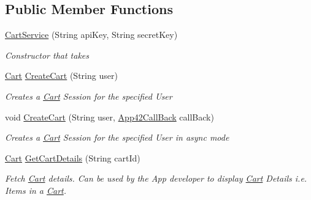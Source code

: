 \subsection*{Public Member Functions}
\begin{DoxyCompactItemize}
\item 
\hyperlink{classcom_1_1shephertz_1_1app42_1_1paas_1_1sdk_1_1csharp_1_1shopping_1_1_cart_service_ae756b1c4cf96224f610c576245f5f782}{Cart\+Service} (String api\+Key, String secret\+Key)
\begin{DoxyCompactList}\small\item\em Constructor that takes \end{DoxyCompactList}\item 
\hyperlink{classcom_1_1shephertz_1_1app42_1_1paas_1_1sdk_1_1csharp_1_1shopping_1_1_cart}{Cart} \hyperlink{classcom_1_1shephertz_1_1app42_1_1paas_1_1sdk_1_1csharp_1_1shopping_1_1_cart_service_a8267edf4fa76e8c868a1ca04895db941}{Create\+Cart} (String user)
\begin{DoxyCompactList}\small\item\em Creates a \hyperlink{classcom_1_1shephertz_1_1app42_1_1paas_1_1sdk_1_1csharp_1_1shopping_1_1_cart}{Cart} Session for the specified User \end{DoxyCompactList}\item 
void \hyperlink{classcom_1_1shephertz_1_1app42_1_1paas_1_1sdk_1_1csharp_1_1shopping_1_1_cart_service_a6e28b51e5c948885ec432381f414992d}{Create\+Cart} (String user, \hyperlink{interfacecom_1_1shephertz_1_1app42_1_1paas_1_1sdk_1_1csharp_1_1_app42_call_back}{App42\+Call\+Back} call\+Back)
\begin{DoxyCompactList}\small\item\em Creates a \hyperlink{classcom_1_1shephertz_1_1app42_1_1paas_1_1sdk_1_1csharp_1_1shopping_1_1_cart}{Cart} Session for the specified User in async mode \end{DoxyCompactList}\item 
\hyperlink{classcom_1_1shephertz_1_1app42_1_1paas_1_1sdk_1_1csharp_1_1shopping_1_1_cart}{Cart} \hyperlink{classcom_1_1shephertz_1_1app42_1_1paas_1_1sdk_1_1csharp_1_1shopping_1_1_cart_service_a246351b145e8081bfcdfc316f2d7de86}{Get\+Cart\+Details} (String cart\+Id)
\begin{DoxyCompactList}\small\item\em Fetch \hyperlink{classcom_1_1shephertz_1_1app42_1_1paas_1_1sdk_1_1csharp_1_1shopping_1_1_cart}{Cart} details. Can be used by the App developer to display \hyperlink{classcom_1_1shephertz_1_1app42_1_1paas_1_1sdk_1_1csharp_1_1shopping_1_1_cart}{Cart} Details i.\+e. Items in a \hyperlink{classcom_1_1shephertz_1_1app42_1_1paas_1_1sdk_1_1csharp_1_1shopping_1_1_cart}{Cart}. \end{DoxyCompactList}\item 

\end{DoxyCompactItemize}
